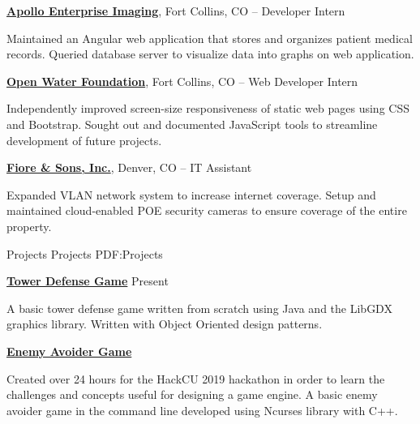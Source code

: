 \documentclass[letterpaper,MMMyyyy,nonstopmode]{simpleresumecv}
\begin{document}
\begin{Body}
\BigGap
\Entry
\href{https://apolloei.com/}{\textbf{Apollo Enterprise Imaging}},  Fort Collins, CO
\hfill
{} --
\BulletItem Developer Intern
\begin{Detail}
\SubBulletItem Maintained an Angular web application that stores and organizes patient medical records.
\SubBulletItem Queried database server to visualize data into graphs on web application.
\end{Detail}

\BigGap
\Entry
\href{http://openwaterfoundation.org/about-owf/staff}{\textbf{Open Water Foundation}},  Fort Collins, CO
\hfill
{} --
\BulletItem Web Developer Intern
\begin{Detail}
\SubBulletItem Independently improved screen-size responsiveness of static web pages using CSS and Bootstrap.
\SubBulletItem Sought out and documented JavaScript tools to streamline development of future projects.
\end{Detail}

\BigGap
\Entry
\href{https://www.fioreandsons.com/}{\textbf{Fiore \& Sons, Inc.}},  Denver, CO
\hfill
{} --
\BulletItem IT Assistant
\begin{Detail}
\SubBulletItem Expanded VLAN network system to increase internet coverage.
\SubBulletItem Setup and maintained cloud-enabled POE security cameras to ensure coverage of the entire property.
\end{Detail}


\Section
{Projects}
{Projects}
{PDF:Projects}

\Entry
\href{https://gitlab.com/Quellus/libgdx-tower-defense}{\textbf{Tower Defense Game}}
\hfill
Present
\Gap
\begin{Detail}
\SubBulletItem A basic tower defense game written from scratch using Java and the LibGDX graphics library.
\SubBulletItem Written with Object Oriented design patterns.
\end{Detail}

\BigGap
\Entry
\href{https://gitlab.com/Quellus/ncurses-game}{\textbf{Enemy Avoider Game}}
\hfill
{}
\Gap
\begin{Detail}
\SubBulletItem  Created over 24 hours for the HackCU 2019 hackathon in order to learn the challenges and concepts useful for designing a game engine.
\SubBulletItem A basic enemy avoider game in the command line developed using Ncurses library with C++.
\end{Detail}



\end{Body}
\end{document}
